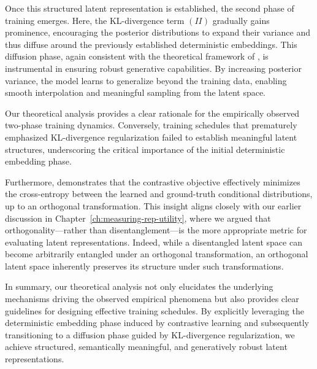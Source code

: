 Once this structured latent representation is established, the second phase of training emerges. Here, the KL-divergence term $(II)$ gradually gains prominence, encouraging the posterior distributions to expand their variance and thus diffuse around the previously established deterministic embeddings. This diffusion phase, again consistent with the theoretical framework of \cite{shwartz2017opening}, is instrumental in ensuring robust generative capabilities. By increasing posterior variance, the model learns to generalize beyond the training data, enabling smooth interpolation and meaningful sampling from the latent space.

Our theoretical analysis provides a clear rationale for the empirically observed two-phase training dynamics. Conversely, training schedules that prematurely emphasized KL-divergence regularization failed to establish meaningful latent structures, underscoring the critical importance of the initial deterministic embedding phase.

Furthermore, \cite{Zimmermann2021-ax} demonstrates that the contrastive objective effectively minimizes the cross-entropy between the learned and ground-truth conditional distributions, up to an orthogonal transformation. This insight aligns closely with our earlier discussion in Chapter~\ref{ch:measuring-rep-utility}, where we argued that orthogonality—rather than disentanglement—is the more appropriate metric for evaluating latent representations. Indeed, while a disentangled latent space can become arbitrarily entangled under an orthogonal transformation, an orthogonal latent space inherently preserves its structure under such transformations.

In summary, our theoretical analysis not only elucidates the underlying mechanisms driving the observed empirical phenomena but also provides clear guidelines for designing effective training schedules. By explicitly leveraging the deterministic embedding phase induced by contrastive learning and subsequently transitioning to a diffusion phase guided by KL-divergence regularization, we achieve structured, semantically meaningful, and generatively robust latent representations.